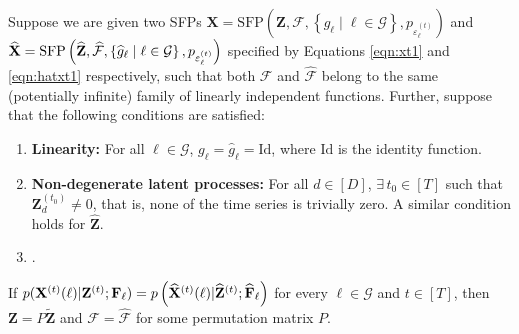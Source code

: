 \setcounter{theorem}{0}

\begin{theorem}
    Suppose we are given two SFPs $\mathbf{X} = \text{SFP}\left(\mathbf{Z}, \mathcal{F}, \left\{ g_{\ell} \mid \ell \in \mathcal{G} \right\}, p_{\varepsilon_{\ell}^{(t)}} \right)$ and $\widehat{\mathbf{X}} = \text{SFP}\left(\widehat{\mathbf{Z}}, \widehat{\mathcal{F}}, \left\{\widehat{g}_{\ell} \mid \ell \in \mathcal{G} \right\}, {p_{{\varepsilon}_{\ell}^{(t)}}} \right)$ specified by Equations \ref{eqn:xt1} and \ref{eqn:hatxt1} respectively, such that both $\mathcal{F}$ and $\widehat{\mathcal{F}}$ belong to the same (potentially infinite) family of linearly independent functions. Further, suppose that the following conditions are satisfied: 
    \begin{enumerate}
        \item \textbf{Linearity:} For all $\ell \in \mathcal{G}$, $\displaystyle g_{\ell} = \widehat{g}_{\ell} = \text{Id}$, where $\text{Id}$ is the identity function.
        \item \textbf{Non-degenerate latent processes:} For all $d \in [D]$,  $\exists \,  t_0 \in [T]$ such that $\mathbf{Z}^{(t_0)}_d \neq 0$, that is, none of the time series is trivially zero. A similar condition holds for $\widehat{\mathbf{Z}}$.
        \item {}.
        
    \end{enumerate}
     If $p(\mathbf{X}^{(t)}(\ell) | \mathbf{Z}^{(t)} ; \mathbf{F}_{\ell}) = p \left(\widehat{\mathbf{X}}^{(t)}(\ell)| \widehat{\mathbf{Z}}^{(t)}; \widehat{\mathbf{F}}_{\ell} \right)$ for every $\ell \in \mathcal{G}$ and $t \in [T]$, then $\mathbf{Z} = P\tilde{\mathbf{Z}}$ and $\mathcal{F} = \widehat{\mathcal{F}}$ for some permutation matrix $P$. \label{thm:linear_sfp_identifiability}
\end{theorem}

